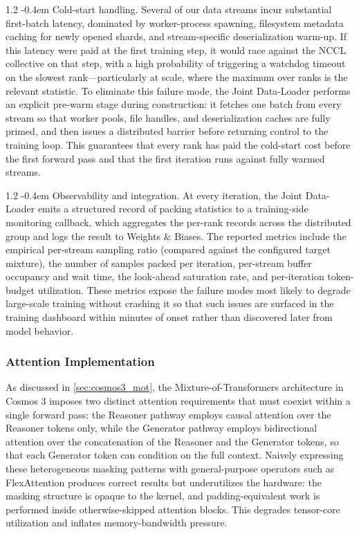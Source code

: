 \documentclass{llmxive}
\makeatletter
\providecommand{\paragraph}{  \@startsection{paragraph}{4}{\z@}    {1\baselineskip \@plus .2\baselineskip}    {-0.4em}    {\normalfont\normalsize\bfseries}}
\makeatother
\begin{document}
\paragraph{Cold-start handling.}
Several of our data streams incur substantial first-batch latency, dominated by worker-process spawning, filesystem metadata caching for newly opened shards, and stream-specific deserialization warm-up. If this latency were paid at the first training step, it would race against the NCCL collective on that step, with a high probability of triggering a watchdog timeout on the slowest rank---particularly at scale, where the maximum over ranks is the relevant statistic. To eliminate this failure mode, the Joint Data-Loader performs an explicit pre-warm stage during construction: it fetches one batch from every stream so that worker pools, file handles, and deserialization caches are fully primed, and then issues a distributed barrier before returning control to the training loop. This guarantees that every rank has paid the cold-start cost before the first forward pass and that the first iteration runs against fully warmed streams.

\paragraph{Observability and integration.}
At every iteration, the Joint Data-Loader emits a structured record of packing statistics to a training-side monitoring callback, which aggregates the per-rank records across the distributed group and logs the result to Weights \& Biases. The reported metrics include the empirical per-stream sampling ratio (compared against the configured target mixture), the number of samples packed per iteration, per-stream buffer occupancy and wait time, the look-ahead saturation rate, and per-iteration token-budget utilization. These metrics expose the failure modes most likely to degrade large-scale training without crashing it so that such issues are surfaced in the training dashboard within minutes of onset rather than discovered later from model behavior.

\subsubsection{Attention Implementation}

As discussed in \cref{sec:cosmos3_mot}, the Mixture-of-Transformers architecture in Cosmos 3 imposes two distinct attention requirements that must coexist within a single forward pass: the Reasoner pathway employs causal attention over the Reasoner tokens only, while the Generator pathway employs bidirectional attention over the concatenation of the Reasoner and the Generator tokens, so that each Generator token can condition on the full context. Naively expressing these heterogeneous masking patterns with general-purpose operators such as FlexAttention produces correct results but underutilizes the hardware: the masking structure is opaque to the kernel, and padding-equivalent work is performed inside otherwise-skipped attention blocks. This degrades tensor-core utilization and inflates memory-bandwidth pressure.
\end{document}
